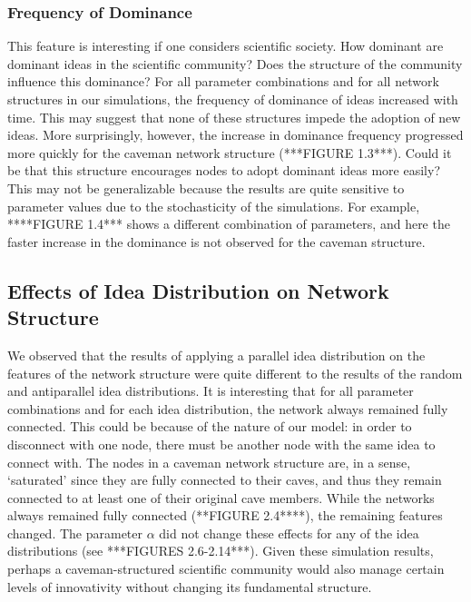 \subsubsection{Frequency of Dominance}

This feature is interesting if one considers scientific society. How dominant are dominant ideas in the scientific community? Does the structure of the community influence this dominance? For all parameter combinations and for all network structures in our simulations, the frequency of dominance of ideas increased with time. This may suggest that none of these structures impede the adoption of new ideas. More surprisingly, however, the increase in dominance frequency progressed more quickly for the caveman network structure (***FIGURE 1.3***). Could it be that this structure encourages nodes to adopt dominant ideas more easily? This may not be generalizable because the results are quite sensitive to parameter values due to the stochasticity of the simulations. For example, ****FIGURE 1.4*** shows a different combination of parameters, and here the faster increase in the dominance is not observed for the caveman structure.




\subsection{Effects of Idea Distribution on Network Structure}


We observed that the results of applying a parallel idea distribution on the features of the network structure were quite different to the results of the random and antiparallel idea distributions. It is interesting that for all parameter combinations and for each idea distribution, the network always remained fully connected. This could be because of the nature of our model: in order to disconnect with one node, there must be another node with the same idea to connect with. The nodes in a caveman network structure are, in a sense, `saturated' since they are fully connected to their caves, and thus they remain connected to at least one of their original cave members. While the networks always remained fully connected (**FIGURE 2.4****), the remaining features changed. The parameter $\alpha$ did not change these effects for any of the idea distributions (see ***FIGURES 2.6-2.14***). Given these simulation results, perhaps a caveman-structured scientific community would also manage certain levels of innovativity without changing its fundamental structure.


